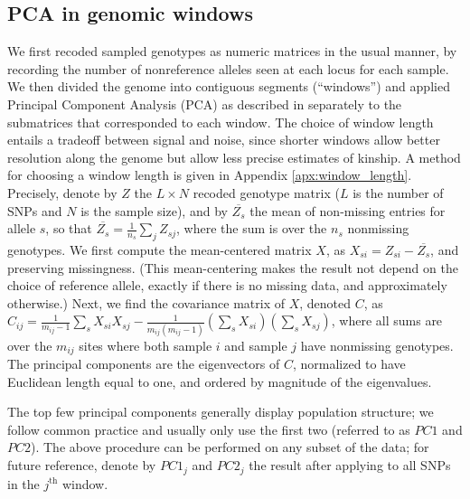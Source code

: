 \documentclass[11pt, oneside]{article}   	%
\newcommand{\pcone}{PC1}
\newcommand{\pctwo}{PC2}
\begin{document}
\subsection{PCA in genomic windows}

We first recoded sampled genotypes as numeric matrices in the usual manner,
by recording the number of nonreference alleles seen at each locus for each sample.
We then divided the genome into contiguous segments 
(``windows'')
and applied Principal Component Analysis (PCA) as described in \citet{mcvean2009genealogical}
separately to the submatrices that corresponded to each window.
The choice of window length entails a tradeoff between signal and noise,
since shorter windows allow better resolution along the genome but allow less precise estimates of kinship.
A method for choosing a window length is given in Appendix \ref{apx:window_length}.
Precisely,
denote by $Z$ the $L\times N$ recoded genotype matrix ($L$ is the number of SNPs and $N$ is the sample size), 
and by $\overline{Z_{s}}$ the mean of non-missing entries for allele $s$, 
so that $\overline{Z_{s}}=\frac{1}{n_s}\sum_j Z_{sj}$, 
where the sum is over the $n_s$ nonmissing genotypes.
We first compute the mean-centered matrix $X$, as $X_{si}=Z_{si}-\overline{Z_{s}}$,
and preserving missingness.
(This mean-centering makes the result not depend on the choice of reference allele,
exactly if there is no missing data, and approximately otherwise.)
Next, we find the covariance matrix of $X$, denoted $C$,
as $C_{ij} = \frac{1}{m_{ij}-1} \sum_s X_{si} X_{sj} - \frac{1}{m_{ij}(m_{ij}-1)} (\sum_s X_{si})(\sum_s X_{sj})$,
where all sums are over the $m_{ij}$ sites where both sample $i$ and sample $j$ have nonmissing genotypes.
The principal components are the eigenvectors of $C$, 
normalized to have Euclidean length equal to one,
and ordered by magnitude of the eigenvalues.

The top few principal components generally display population structure; 
we follow common practice and usually only use the first two (referred to as $\pcone$ and $\pctwo$).
The above procedure can be performed on any subset of the data;
for future reference, denote by $\pcone_j$ and $\pctwo_j$
the result after applying to all SNPs in the $j^\text{th}$ window.
\end{document}
